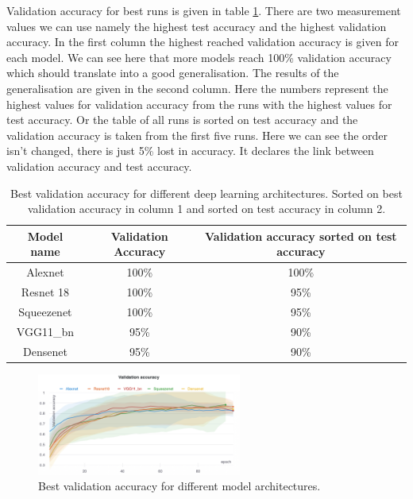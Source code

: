 		Validation accuracy for best runs is given in table \ref{tab:results:shm:architectures:valacc}. There are two measurement values we can use namely the highest test accuracy and the highest validation accuracy. In the first column the highest reached validation accuracy is given for each model. We can see here that more models reach 100\% validation accuracy which should translate into a good generalisation. The results of the generalisation are given in the second column. Here the numbers represent the highest values for validation accuracy from the runs with the highest values for test accuracy. Or the table of all runs is sorted on test accuracy and the validation accuracy is taken from the first five runs. Here we can see the order isn't changed, there is just 5\% lost in accuracy. It declares the link between validation accuracy and test accuracy. 
		\begin{table}
		\caption{Best validation accuracy for different deep learning architectures. Sorted on best validation accuracy in column 1 and sorted on test accuracy in column 2.}
			\begin{tabular}{ c | c c }
			Model name		& Validation Accuracy 	& Validation accuracy sorted on test accuracy	\\ \hline
		 	Alexnet 				& 100\%						& 100\% 				\\ 
		 	Resnet 18 			& 100\%						& 95\%					\\
		 	Squeezenet 		& 100\%						& 95\%					\\
		 	VGG11\_bn			& 95\%							& 90\%					\\
		 	Densenet			& 95\%							& 90\%					\\
			\end{tabular}
			\label{tab:results:shm:architectures:valacc}
		\end{table}

	\begin{figure}[hbtp]
		\centering
		\includegraphics[width=0.6\textwidth]{fig/results/wandb/second_handmade_sweep/charts/valid_accuracy_median.png}
		\caption{Best validation accuracy for different model architectures.}
		\label{fig:results:shm:validaccuracy}
	\end{figure}


